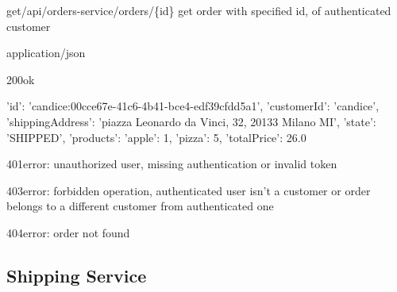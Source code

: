 \begin{apiRoute}{get}{/api/orders-service/orders/\{id\}} {get order with specified id, of authenticated customer}
	\begin{routeParameter}
	\end{routeParameter}
	\begin{routeResponse}{application/json}
		\begin{routeResponseItem}{200}{ok}
			\begin{routeResponseItemBody}
{   
    'id': 'candice:00cce67e-41c6-4b41-bce4-edf39cfdd5a1',
    'customerId': 'candice',
    'shippingAddress': 'piazza Leonardo da Vinci, 32, 20133 Milano MI',
    'state': 'SHIPPED',
    'products': {'apple': 1, 'pizza': 5},
    'totalPrice': 26.0
}
			\end{routeResponseItemBody}
		\end{routeResponseItem}
	    \begin{routeResponseItem}{401}{error: unauthorized user, missing authentication or invalid token}
    	    \begin{routeResponseItemBody}
			\end{routeResponseItemBody}
		\end{routeResponseItem}
	    \begin{routeResponseItem}{403}{error: forbidden operation, authenticated user isn't a customer or order belongs to a different customer from authenticated one}
    	    \begin{routeResponseItemBody}
		    \end{routeResponseItemBody}
	    \end{routeResponseItem}	
	    \begin{routeResponseItem}{404}{error: order not found}
    		\begin{routeResponseItemBody}
        	\end{routeResponseItemBody} 
		\end{routeResponseItem}
	\end{routeResponse}
\end{apiRoute}

\pagebreak
\subsection{Shipping Service}


